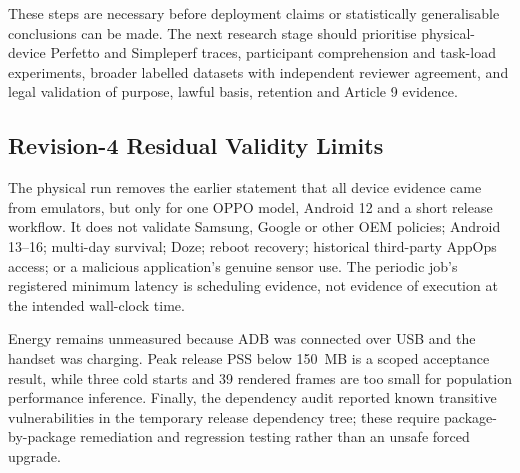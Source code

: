 These steps are necessary before deployment claims or statistically generalisable conclusions can be made. The next research stage should prioritise physical-device Perfetto and Simpleperf traces, participant comprehension and task-load experiments, broader labelled datasets with independent reviewer agreement, and legal validation of purpose, lawful basis, retention and Article 9 evidence.
\subsection{Revision-4 Residual Validity Limits}

The physical run removes the earlier statement that all device evidence came from emulators, but only for one OPPO model, Android 12 and a short release workflow. It does not validate Samsung, Google or other OEM policies; Android 13--16; multi-day survival; Doze; reboot recovery; historical third-party AppOps access; or a malicious application's genuine sensor use. The periodic job's registered minimum latency is scheduling evidence, not evidence of execution at the intended wall-clock time.

Energy remains unmeasured because ADB was connected over USB and the handset was charging. Peak release PSS below 150~MB is a scoped acceptance result, while three cold starts and 39 rendered frames are too small for population performance inference. Finally, the dependency audit reported known transitive vulnerabilities in the temporary release dependency tree; these require package-by-package remediation and regression testing rather than an unsafe forced upgrade.
